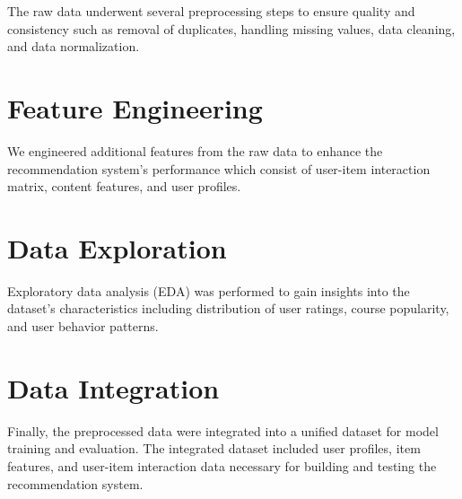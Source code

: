 The raw data underwent several preprocessing steps to ensure quality and consistency 
such as removal of duplicates, handling missing values, data cleaning, and data normalization.

\section{Feature Engineering}

We engineered additional features from the raw data to enhance the recommendation system's 
performance which consist of user-item interaction matrix, content features, and user profiles.

\section{Data Exploration}

Exploratory data analysis (EDA) was performed to gain insights into the dataset's characteristics
including distribution of user ratings, course popularity, and user behavior patterns.

\section{Data Integration}

Finally, the preprocessed data were integrated into a unified dataset for model training and 
evaluation. The integrated dataset included user profiles, item features, and user-item 
interaction data necessary for building and testing the recommendation system.
